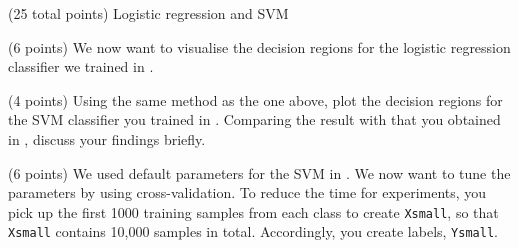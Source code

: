 \documentclass[12pt]{article}
\begin{document}
\begin{question}{(25 total points) Logistic regression and SVM}
\begin{subquestion}{(6 points)
       We now want to visualise the decision regions for the logistic
       regression classifier we trained in .
     }
   \end{subquestion}
   \begin{subquestion}{(4 points)
       Using the same method as the one above, plot the decision regions for
       the SVM classifier you trained in .
       Comparing the result with that you obtained in , discuss your
       findings briefly.
     } \label{Q2.4}
   

  


   \end{subquestion}

   \begin{subquestion}{(6 points)
       We used default parameters for the SVM in .
       We now want to tune the parameters by using cross-validation.
       To reduce the time for experiments, you pick up the first 1000
       training samples from each class to create \texttt{Xsmall}, so that \texttt{Xsmall}
       contains 10,000 samples in total. Accordingly, you create
       labels, \texttt{Ysmall}.
     } \label{Q2.5}



\end{subquestion}
\end{question}
\end{document}
